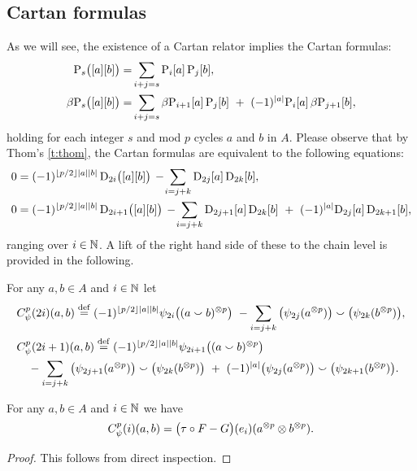 \subsection{Cartan formulas}

As we will see, the existence of a Cartan relator implies the Cartan formulas:
\begin{align*}
	\mathrm{P}_s\big([a][b]\big) =&
	\sum_{i+j=s} \mathrm{P}_i[a] \, \mathrm{P}_j[b], \\
	\beta\mathrm{P}_s\big([a][b]\big) =&
	\sum_{i+j=s} \beta\mathrm{P}_{i+1}[a] \, \mathrm{P}_j[b] \ +\ (-1)^{\lvert a\rvert} \mathrm{P}_i[a] \, \beta\mathrm{P}_{j+1}[b],
\end{align*}
holding for each integer $s$ and mod $p$ cycles $a$ and $b$ in $A$.
Please observe that by Thom's \cref{t:thom}, the Cartan formulas are equivalent to the following equations:
\begin{align*}
	0 &= (-1)^{\floor{p/2}\bars{a}\bars{b}} \, \rD_{2i}\big([a][b]\big) \,-\!
	\sum_{i=j+k} \rD_{2j}[a] \, \rD_{2k}[b], \\
	0 &= (-1)^{\floor{p/2}\bars{a}\bars{b}} \, \rD_{2i+1}\big([a][b]\big) \,-\!
	\sum_{i=j+k} \rD_{2j+1}[a] \, \rD_{2k}[b] \ +\ (-1)^{\bars{a}}\rD_{2j}[a] \, \rD_{2k+1}[b],
\end{align*}
ranging over $i \in \mathbb{N}$.
A lift of the right hand side of these to the chain level is provided in the following.

\begin{definition}
	For any $a,b \in A$ and $i \in \mathbb{N}$ let
	\begin{align*}
		&C_\psi^p(2i)(a,b) \stackrel{\mathrm{def}}{=} (-1)^{\lfloor p/2\rfloor\lvert a\rvert\lvert b\rvert} \psi_{2i}\big((a \smallsmile b)^{\otimes p}\big) \ -
		\sum_{i=j+k}\big(\psi_{2j}(a^{\otimes p})\big) \smallsmile \big(\psi_{2k}(b^{\otimes p})\big), \\
		&C_\psi^p(2i+1)(a,b) \stackrel{\mathrm{def}}{=} (-1)^{\lfloor p/2\rfloor\lvert a\rvert\lvert b\rvert} \psi_{2i+1}\big((a \smallsmile b)^{\otimes p}\big) \\
		&\quad -\sum_{i=j+k} \big(\psi_{2j+1}(a^{\otimes p})\big) \smallsmile \big(\psi_{2k}(b^{\otimes p})\big)\ +\
		(-1)^{\lvert a\rvert}\big(\psi_{2j}(a^{\otimes p})\big) \smallsmile \big(\psi_{2k+1}(b^{\otimes p})\big).
	\end{align*}
\end{definition}

\begin{lemma}
	For any $a,b \in A$ and $i \in \mathbb{N}$ we have
	\[
	C^p_\psi(i)(a,b) =
	\big(\tau \mathbin{\circ} F - G\big)(e_i)(a^{\otimes p} \otimes b^{\otimes p}).
	\]
\end{lemma}

\begin{proof}
	This follows from direct inspection.
\end{proof}

